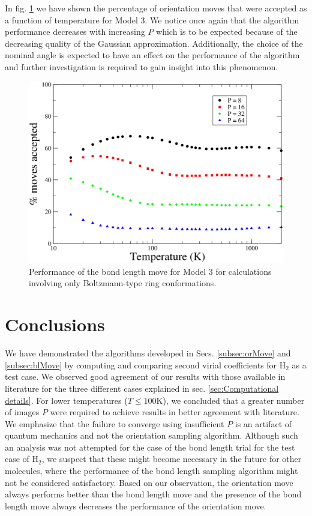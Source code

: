                 In fig. \ref{fig:variableBlAcc} we have shown the percentage of orientation moves that were accepted as a function of temperature for Model 3. We notice once again that the algorithm performance decreases with increasing $P$ which is to be expected because of the decreasing quality of the Gaussian approximation. Additionally, the choice of the nominal angle is expected to have an effect on the performance of the algorithm and further investigation is required to gain insight into this phenomenon.
                \begin{figure}[!htbp]
                    \centering
                    \includegraphics[scale=0.20,keepaspectratio]{Chapter-4/Figures/s3BlAcc.png}
                    \caption{Performance of the bond length move for Model 3 for calculations involving only Boltzmann-type ring conformations.}
                    \label{fig:variableBlAcc}
                \end{figure}

    \section{Conclusions}
        \label{sec:Conclusions and future work}
        We have demonstrated the algorithms developed in Secs. \ref{subsec:orMove} and \ref{subsec:blMove} by computing and comparing second virial coefficients for H$_2$ as a test case. We observed good agreement of our results with those available in literature for the three different cases explained in sec. \ref{sec:Computational details}. For lower temperatures ($T \le 100 $K), we concluded that a greater number of images $P$ were required to achieve results in better agreement with literature. We emphasize that the failure to converge using insufficient $P$ is an artifact of quantum mechanics and not the orientation sampling algorithm. Although such an analysis was not attempted for the case of the bond length trial for the test case of H$_2$, we suspect that these might become necessary in the future for other molecules, where the performance of the bond length sampling algorithm might not be considered satisfactory. Based on our observation, the orientation move always performs better than the bond length move and the presence of the bond length move always decreases the performance of the orientation move.

